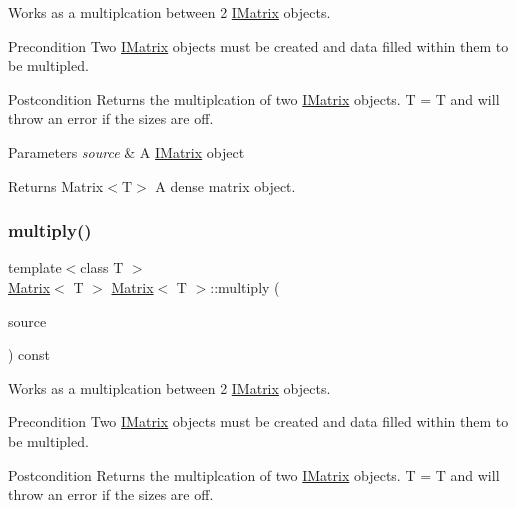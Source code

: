 Works as a multiplcation between 2 \mbox{\hyperlink{class_i_matrix}{I\+Matrix}} objects. 

\begin{DoxyPrecond}{Precondition}
Two \mbox{\hyperlink{class_i_matrix}{I\+Matrix}} objects must be created and data filled within them to be multipled. 
\end{DoxyPrecond}
\begin{DoxyPostcond}{Postcondition}
Returns the multiplcation of two \mbox{\hyperlink{class_i_matrix}{I\+Matrix}} objects. T = T and will throw an error if the sizes are off.
\end{DoxyPostcond}

\begin{DoxyParams}{Parameters}
{\em source} & A \mbox{\hyperlink{class_i_matrix}{I\+Matrix}} object \\
\hline
\end{DoxyParams}
\begin{DoxyReturn}{Returns}
Matrix$<$\+T$>$ A dense matrix object. 
\end{DoxyReturn}
\mbox{\label{class_matrix_a5e6ec967ac129d9944ee1c735ea5407e}} 
\subsubsection{\texorpdfstring{multiply()}{multiply()}\hspace{0.1cm}{\footnotesize\ttfamily [5/6]}}
{\footnotesize\ttfamily template$<$class T $>$ \\
\mbox{\hyperlink{class_matrix}{Matrix}}$<$ T $>$ \mbox{\hyperlink{class_matrix}{Matrix}}$<$ T $>$\+::multiply (\begin{DoxyParamCaption}\item[{const \mbox{\hyperlink{class_i_matrix}{I\+Matrix}}$<$ \mbox{\hyperlink{class_s_matrix}{S\+Matrix}}$<$ T $>$, T $>$ \&}]{source }\end{DoxyParamCaption}) const}



Works as a multiplcation between 2 \mbox{\hyperlink{class_i_matrix}{I\+Matrix}} objects. 

\begin{DoxyPrecond}{Precondition}
Two \mbox{\hyperlink{class_i_matrix}{I\+Matrix}} objects must be created and data filled within them to be multipled. 
\end{DoxyPrecond}
\begin{DoxyPostcond}{Postcondition}
Returns the multiplcation of two \mbox{\hyperlink{class_i_matrix}{I\+Matrix}} objects. T = T and will throw an error if the sizes are off.
\end{DoxyPostcond}

